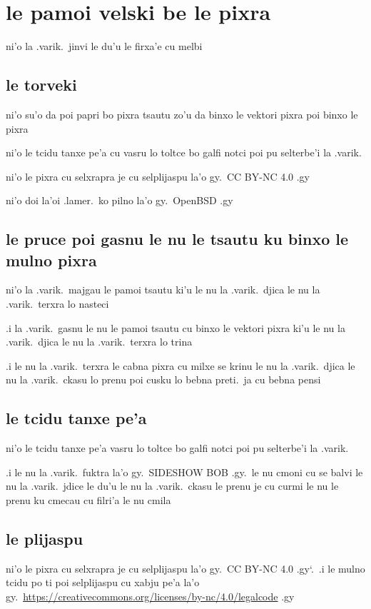 \documentclass{report}
\newcommand\sds{\spacefactor\sfcode`.\ \space}
\begin{document}
\section{le pamoi velski be le pixra}
ni'o la .varik.\ jinvi le du'u le firxa'e cu melbi

\subsection{le torveki}
ni'o su'o da poi papri bo pixra tsautu zo'u da binxo le vektori pixra poi binxo le pixra

ni'o le tcidu tanxe pe'a cu vasru lo toltce bo galfi notci poi pu selterbe'i la .varik.

ni'o le pixra cu selxrapra je cu selplijaspu la'o gy.\ CC BY-NC 4.0 .gy

ni'o doi la'oi .lamer.\ ko pilno la'o gy.\ OpenBSD .gy

\subsection{le pruce poi gasnu le nu le tsautu ku binxo le mulno pixra}
ni'o la .varik.\ majgau le pamoi tsautu ki'u le nu la .varik.\ djica le nu la .varik.\ terxra lo nasteci

.i la .varik.\ gasnu le nu le pamoi tsautu cu binxo le vektori pixra ki'u le nu la .varik.\ djica le nu la .varik.\ terxra lo trina

.i le nu la .varik.\ terxra le cabna pixra cu milxe se krinu le nu la .varik.\ djica le nu la .varik.\ ckasu lo prenu poi cusku lo bebna preti.\ ja cu bebna pensi

\subsection{le tcidu tanxe pe'a}
ni'o le tcidu tanxe pe'a vasru lo toltce bo galfi notci poi pu selterbe'i la .varik.

.i le nu la .varik.\ fuktra la'o gy.\ SIDESHOW BOB .gy.\ le nu cmoni cu se balvi le nu la .varik.\ jdice le du'u le nu la .varik.\ ckasu le prenu je cu curmi le nu le prenu ku cmecau cu filri'a le nu cmila

\subsection{le plijaspu}
ni'o le pixra cu selxrapra je cu selplijaspu la'o gy.\ CC BY-NC 4.0 .gy\sds  .i le mulno tcidu po ti poi selplijaspu cu xabju pe'a la'o gy.\ \url{https://creativecommons.org/licenses/by-nc/4.0/legalcode} .gy
\end{document}

